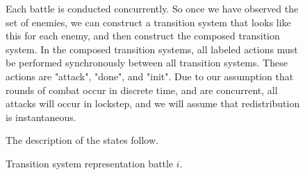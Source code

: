\documentclass[11pt]{article}
\theoremstyle{definition}
\begin{document}
\begin{figure}
    \begin{center}
    \end{center}
    \caption{
        Transition system representation battle $i$.
    }
    \label{tikz:battle}
    \small
    \justify
    \par
    Each battle is conducted concurrently. So once we
    have observed the set of enemies, we can construct
    a transition system that looks like this for each enemy,
    and then construct the composed transition system.
    In the composed transition systems, all labeled actions
    must be performed synchronously between all
    transition systems. These actions are "attack", "done", and "init".
    Due to our assumption that rounds of combat
    occur in discrete time, and are concurrent,
    all attacks will occur in lockstep, and
    we will assume that redistribution is instantaneous.

    The description of the states follow.


\end{figure}
\end{document}
